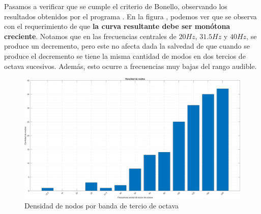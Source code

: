 \par Pasamos a verificar que se cumple el criterio de Bonello, observando los resultados obtenidos por el programa . En la figura , podemos ver que se observa con el requerimiento de que \textbf{la curva resultante debe ser monótona creciente}. Notamos que en las frecuencias centrales de $20Hz$, $31.5Hz$ y $40Hz$, se produce un decremento, pero este no afecta dada la salvedad de que cuando se produce el decremento se tiene la misma cantidad de modos en dos tercios de octava sucesivos. Además, esto ocurre a frecuencias muy bajas del rango audible.


\begin{figure}[H]
	\centering
	\includegraphics[width=1\textwidth]{./img/modos_resonancia.png}
	\caption{Densidad de nodos por banda de tercio de octava}
	\label{fig:modos_resonancia}
\end{figure}

\newpage

